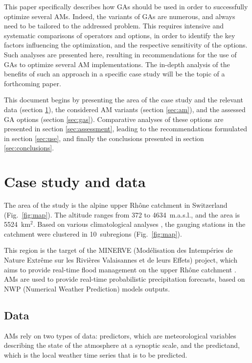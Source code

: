 \documentclass{ametsoc}
\begin{document}
This paper specifically describes how GAs should be used in order to successfully optimize several AMs. Indeed, the variants of GAs are numerous, and always need to be tailored to the addressed problem. This requires intensive and systematic comparisons of operators and options, in order to identify the key factors influencing the optimization, and the respective sensitivity of the options. Such analyses are presented here, resulting in recommendations for the use of GAs to optimize several AM implementations. The in-depth analysis of the benefits of such an approach in a specific case study will be the topic of a forthcoming paper. 

This document begins by presenting the area of the case study and the relevant data (section \ref{sec:case_study_data}), the considered AM variants (section \ref{sec:am}), and the assessed GA options (section \ref{sec:gas}). Comparative analyses of these options are presented in section \ref{sec:assessment}, leading to the recommendations formulated in section \ref{sec:use}, and finally the conclusions presented in section \ref{sec:conclusions}.


\section{Case study and data}
\label{sec:case_study_data}

The area of the study is the alpine upper Rh\^{o}ne catchment in Switzerland (Fig.\ \ref{fig:map}). The altitude ranges from 372 to 4634~m.a.s.l., and the area is 5524~km$^{2}$. Based on various climatological analyses \cite[see][for the details]{Horton2012a}, the gauging stations in the catchment were clustered in 10~subregions (Fig.\ \ref{fig:map}).

This region is the target of the MINERVE (Mod\'{e}lisation des Intemp\'{e}ries de Nature Extr\^{e}me sur les Rivi\`{e}res Valaisannes et de leurs Effets) project, which aims to provide real-time flood management on the upper Rh\^{o}ne catchment \citep{GarciaHernandez2009b}. AMs are used to provide real-time probabilistic precipitation forecasts, based on NWP (Numerical Weather Prediction) models outputs. 


\subsection{Data}
\label{sec:data}

AMs rely on two types of data: predictors, which are meteorological variables describing the state of the atmosphere at a synoptic scale, and the predictand, which is the local weather time series that is to be predicted.
\end{document}
